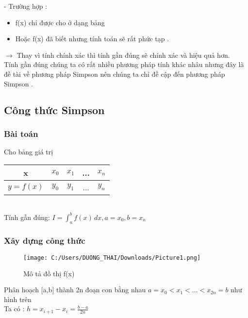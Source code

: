 \documentclass[14pt,a4paper]{article}
\begin{document}
\fontsize{13pt}{2pt}\selectfont - Trường hợp : \\
\begin{itemize}
\item  \fontsize{13pt}{2pt}\selectfont 	f(x) chỉ được cho ở dạng bảng  \\
\item \fontsize{13pt}{2pt}\selectfont 	Hoặc f(x) đã biết nhưng tính toán sẽ rất phức tạp .\\
\end{itemize}
 $\to$	Thay vì tính chính xác thì tính gần đúng sẽ chính xác và hiệu quả hơn.\\
\hspace*{1cm} Tính gần đúng chúng ta có rất nhiều phương pháp  tính khác nhâu nhưng đây là đề tài về phương pháp Simpson nên chúng ta chỉ đề cập đến phương pháp Simpson .\\
\subsection{ Công thức Simpson}
\subsubsection {Bài toán}
 \vspace{6pt }Cho bảng giá trị
\begin{tabular}{c|c|c|c|c}
	
	x &  ${\displaystyle x_0}$ &  ${\displaystyle x_1}$ & ... &  ${\displaystyle x_n}$ \\
	\hline
	${\displaystyle y=f(x)}$ &  ${\displaystyle y_0}$ &  ${\displaystyle y_1}$ & ... &  ${\displaystyle y_n}$ \\
	
\end{tabular} \\ 
\hspace*{30pt} Tính gần đúng: ${\displaystyle I=\int_{a}^{b}f(x)\,dx ,a=x_0 ,b=x_n}$ \\
\subsubsection{Xây dựng công thức }

\begin{figure}[H]
	\centering
	
	\texttt{[image: C:/Users/DUONG\_THAI/Downloads/Picture1.png]}
	\caption[Mô tả đồ thị f(x)]{Mô tả đồ thị f(x)}
	\label{hinh21}
\end{figure}
 	   Phân hoạch [a,b] thành 2n đoạn con bằng nhau ${\displaystyle a=x_0<x_1<…<x_{2n}=b}$ như hình trên\\
 	   \vspace{6pt}
 	   \hspace*{30pt}Ta có : ${\displaystyle h= x_{i+1} - x_i = \frac{b-a}{2n}}$\\ 
 	   
\end{document}
